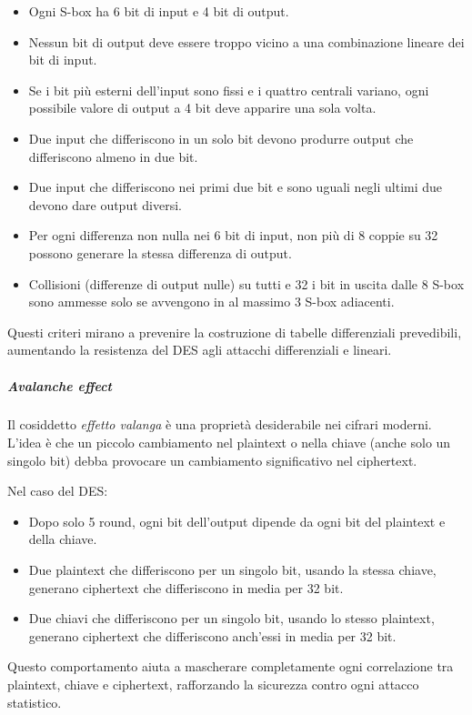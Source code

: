 \documentclass{report}
\begin{document}
\begin{itemize}
    \item Ogni S-box ha 6 bit di input e 4 bit di output.
    \item Nessun bit di output deve essere troppo vicino a una combinazione lineare dei bit di input.
    \item Se i bit più esterni dell’input sono fissi e i quattro centrali variano, ogni possibile valore di output a 4 bit deve apparire una sola volta.
    \item Due input che differiscono in un solo bit devono produrre output che differiscono almeno in due bit.
    \item Due input che differiscono nei primi due bit e sono uguali negli ultimi due devono dare output diversi.
    \item Per ogni differenza non nulla nei 6 bit di input, non più di 8 coppie su 32 possono generare la stessa differenza di output.
    \item Collisioni (differenze di output nulle) su tutti e 32 i bit in uscita dalle 8 S-box sono ammesse solo se avvengono in al massimo 3 S-box adiacenti.
\end{itemize}

Questi criteri mirano a prevenire la costruzione di tabelle differenziali prevedibili, aumentando la resistenza del DES agli attacchi differenziali e lineari.

\subparagraph{Avalanche effect}

Il cosiddetto \textit{effetto valanga} è una proprietà desiderabile nei cifrari moderni. L’idea è che un piccolo cambiamento nel plaintext o nella chiave (anche solo un singolo bit) debba provocare un cambiamento significativo nel ciphertext.

Nel caso del DES:
\begin{itemize}
    \item Dopo solo 5 round, ogni bit dell’output dipende da ogni bit del plaintext e della chiave.
    \item Due plaintext che differiscono per un singolo bit, usando la stessa chiave, generano ciphertext che differiscono in media per 32 bit.
    \item Due chiavi che differiscono per un singolo bit, usando lo stesso plaintext, generano ciphertext che differiscono anch’essi in media per 32 bit.
\end{itemize}

Questo comportamento aiuta a mascherare completamente ogni correlazione tra plaintext, chiave e ciphertext, rafforzando la sicurezza contro ogni attacco statistico.
\end{document}
